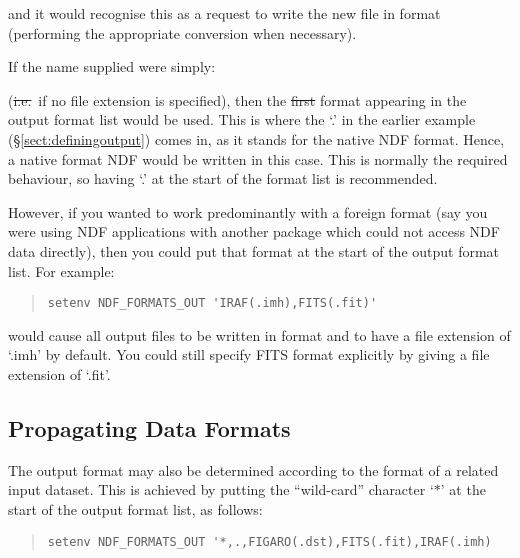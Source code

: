 \begin{quote}
\end{quote}

and it would recognise this as a request to write the new file in
 format (performing the appropriate
conversion when necessary).

If the name supplied were simply:

\begin{quote}
\end{quote}

(\st{i.e.}\ if no file extension is specified), then the \st{first}
format appearing in the output format list would be used. This is
where the `.' in the earlier example (\S\ref{sect:definingoutput})
comes in, as it stands for the native NDF format. Hence, a native
format NDF would be written in this case. This is normally the
required behaviour, so having `.' at the start of the format list is
recommended.

However, if you wanted to work predominantly with a foreign format
(say you were using NDF applications with another package which could
not access NDF data directly), then you could put that format at the
start of the output format list. For example:

\begin{quote}
\begin{small}
\begin{verbatim}
setenv NDF_FORMATS_OUT 'IRAF(.imh),FITS(.fit)'
\end{verbatim}
\end{small}
\end{quote}

would cause all output files to be written in 
format and to have a file extension of `.imh' by default. You could
still specify FITS format explicitly by giving a file extension of
`.fit'.

\subsection{Propagating Data Formats}

The output format may also be determined according to the format of a
related input dataset. This is achieved by putting the ``wild-card''
character `$*$' at the start of the output format list, as follows:

\begin{quote}
\begin{small}
\begin{verbatim}
setenv NDF_FORMATS_OUT '*,.,FIGARO(.dst),FITS(.fit),IRAF(.imh)
\end{verbatim}
\end{small}
\end{quote}

